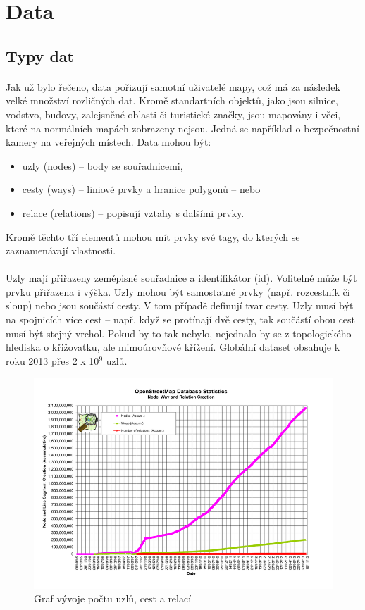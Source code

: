 \documentclass[11pt,a4paper,titlepage,oneside]{book}
\begin{document}
	\section{Data}
		\subsection{Typy dat}
		\paragraph{} Jak už bylo řečeno, data pořizují samotní uživatelé mapy, což má za následek velké množství rozličných dat. Kromě standartních objektů, jako jsou silnice, vodstvo, budovy, zalejsněné oblasti či turistické značky, jsou mapovány i věci, které na normálních mapách zobrazeny nejsou. Jedná se například o bezpečnostní kamery na veřejných místech. Data mohou být:
	\begin{itemize}
		\item uzly (nodes) -- body se souřadnicemi,
		\item cesty (ways) -- liniové prvky a hranice polygonů -- nebo
		\item relace (relations) -- popisují vztahy s dalšími prvky.
	\end{itemize}
Kromě těchto tří elementů mohou mít prvky své tagy, do kterých se zaznamenávají  vlastnosti. 			\paragraph{}Uzly mají přiřazeny zeměpisné souřadnice a identifikátor (id). Volitelně může být prvku přiřazena i výška. Uzly mohou být samostatné prvky (např. rozcestník či sloup) nebo jsou součástí cesty. V tom případě definují tvar cesty. Uzly musí být na spojnicích více cest -- např. když se protínají dvě cesty, tak součástí obou cest musí být stejný vrchol. Pokud by to tak nebylo, nejednalo by se z topologického hlediska o křižovatku, ale mimoúrovňové křížení. Globální dataset obsahuje k roku 2013 přes 2 x 10$^9$ uzlů.

		\begin{figure}[!h]
			\begin{center}
				\includegraphics[width=12cm]{obrazky/osm_stat_elements.png}
				\caption{Graf vývoje počtu uzlů, cest a relací}
			\end{center}
		\end{figure}
\end{document}
